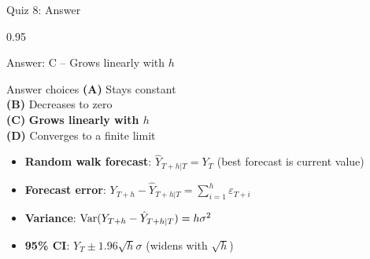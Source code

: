 \documentclass[9pt, aspectratio=169, t]{beamer}
\begin{document}
\begin{frame}{Quiz 8: Answer}
    \begin{cminipage}{0.95\textwidth}
    {\small
    \begin{exampleblock}{Answer: C -- Grows linearly with $h$}

        \vspace{0.1cm}

    \begin{block}{Answer choices}
        \textcolor{MainBlue}{\textbf{(A)}} Stays constant \incorrect\\[3pt]
        \textcolor{MainBlue}{\textbf{(B)}} Decreases to zero \incorrect\\[3pt]
        \textcolor{MainBlue}{\textbf{(C)}} \textbf{\textcolor{Forest}{Grows linearly with $h$}} \correct\\[3pt]
        \textcolor{MainBlue}{\textbf{(D)}} Converges to a finite limit \incorrect
    \end{block}

        \vspace{0.2cm}

        \begin{itemize}
            \item \textbf{Random walk forecast}: $\hat{Y}_{T+h|T} = Y_T$ (best forecast is current value)
            \item \textbf{Forecast error}: $Y_{T+h} - \hat{Y}_{T+h|T} = \sum_{i=1}^{h} \varepsilon_{T+i}$
            \item \textbf{Variance}: $\text{Var}(Y_{T+h} - \hat{Y}_{T+h|T}) = h\sigma^2$
            \item \textbf{95\% CI}: $Y_T \pm 1.96\sqrt{h}\sigma$ (widens with $\sqrt{h}$)
        \end{itemize}
    \end{exampleblock}
    }

    \end{cminipage}
\end{frame}
\end{document}
